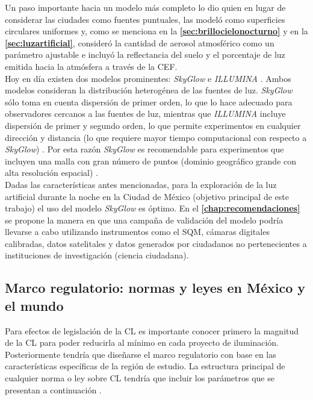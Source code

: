 Un paso importante hacia un modelo más completo lo dio \cite{Garstang1986} quien en lugar de considerar las ciudades como fuentes puntuales, las modeló como superficies circulares uniformes \citep{Linares2018} y, como se menciona en la \textbf{\autoref{sec:brillocielonocturno}} y en la \textbf{\autoref{sec:luzartificial}}, consideró la cantidad de aerosol atmosférico como un parámetro ajustable e incluyó la reflectancia del suelo y el porcentaje de luz emitida hacia la atmósfera a través de la CEF.\\

Hoy en día existen dos modelos prominentes: \textit{SkyGlow} \citep{Kocifaj2007} e \textit{ILLUMINA} \citep{Aube2005}. Ambos modelos consideran la distribución heterogénea de las fuentes de luz. \textit{SkyGlow} sólo toma en cuenta dispersión de primer orden, lo que lo hace adecuado para observadores cercanos a las fuentes de luz, mientras que \textit{ILLUMINA} incluye dispersión de primer y segundo orden, lo que permite experimentos en cualquier dirección y distancia (lo que requiere mayor tiempo computacional con respecto a \textit{SkyGlow}) \citep{Linares2018}. Por esta razón \textit{SkyGlow} es recomendable para experimentos que incluyen una malla con gran número de puntos (dominio geográfico grande con alta resolución espacial) \citep{Linares2018}.\\

Dadas las características antes mencionadas, para la exploración de la luz artificial durante la noche en la Ciudad de México (objetivo principal de este trabajo) el uso del modelo \textit{SkyGlow} es óptimo. En el  \textbf{\autoref{chap:recomendaciones}} se propone la manera en que una campaña de validación del modelo podría llevarse a cabo utilizando instrumentos como el SQM, cámaras digitales calibradas, datos satelitales y datos generados por ciudadanos no pertenecientes a instituciones de investigación (ciencia ciudadana).\\

\newpage

\subsection{Marco regulatorio: normas y leyes en México y el mundo}
\label{subsec:marcoregulatorio}

Para efectos de legislación de la CL es importante conocer primero la magnitud de la CL para poder reducirla al mínimo en cada proyecto de iluminación. Posteriormente tendría que diseñarse el marco regulatorio con base en las características específicas de la región de estudio. La estructura principal de cualquier norma o ley sobre CL tendría que incluir los parámetros que se presentan a continuación \citep{LibroCL}.\\


